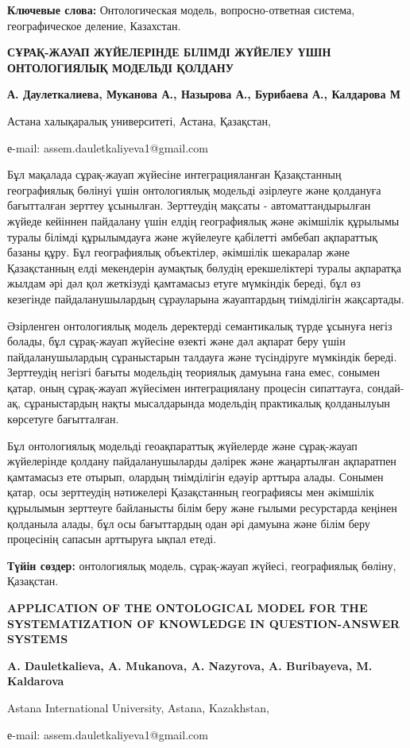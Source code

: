 {\bfseries Ключевые слова:} Онтологическая модель, вопросно-ответная
система, географическое деление, Казахстан.

\begin{center}
{\large\bfseries СҰРАҚ-ЖАУАП ЖҮЙЕЛЕРІНДЕ БІЛІМДІ ЖҮЙЕЛЕУ ҮШІН ОНТОЛОГИЯЛЫҚ МОДЕЛЬДІ ҚОЛДАНУ}

{\bfseries А. Даулеткалиева\envelope, Муканова А., Назырова А., Бурибаева А.,
Калдарова М}

Астана халықаралық университеті, Астана, Қазақстан,

е-mail: assem.dauletkaliyeva1@gmail.com
\end{center}

Бұл мақалада сұрақ-жауап жүйесіне интеграцияланған Қазақстанның
географиялық бөлінуі үшін онтологиялық модельді әзірлеуге және қолдануға
бағытталған зерттеу ұсынылған. Зерттеудің мақсаты - автоматтандырылған
жүйеде кейіннен пайдалану үшін елдің географиялық және әкімшілік
құрылымы туралы білімді құрылымдауға және жүйелеуге қабілетті әмбебап
ақпараттық базаны құру. Бұл географиялық объектілер, әкімшілік шекаралар
және Қазақстанның елді мекендерін аумақтық бөлудің ерекшеліктері туралы
ақпаратқа жылдам әрі дәл қол жеткізуді қамтамасыз етуге мүмкіндік
береді, бұл өз кезегінде пайдаланушылардың сұрауларына жауаптардың
тиімділігін жақсартады.

Әзірленген онтологиялық модель деректерді семантикалық түрде ұсынуға
негіз болады, бұл сұрақ-жауап жүйесіне өзекті және дәл ақпарат беру үшін
пайдаланушылардың сұраныстарын талдауға және түсіндіруге мүмкіндік
береді. Зерттеудің негізгі бағыты модельдің теориялық дамуына ғана емес,
сонымен қатар, оның сұрақ-жауап жүйесімен интеграциялану процесін
сипаттауға, сондай-ақ, сұраныстардың нақты мысалдарында модельдің
практикалық қолданылуын көрсетуге бағытталған.

Бұл онтологиялық модельді геоақпараттық жүйелерде және сұрақ-жауап
жүйелерінде қолдану пайдаланушыларды дәлірек және жаңартылған ақпаратпен
қамтамасыз ете отырып, олардың тиімділігін едәуір арттыра алады. Сонымен
қатар, осы зерттеудің нәтижелері Қазақстанның географиясы мен әкімшілік
құрылымын зерттеуге байланысты білім беру және ғылыми ресурстарда
кеңінен қолданыла алады, бұл осы бағыттардың одан әрі дамуына және білім
беру процесінің сапасын арттыруға ықпал етеді.

{\bfseries Түйін сөздер:} онтологиялық модель, сұрақ-жауап жүйесі,
географиялық бөліну, Қазақстан.

\begin{center}
{\large\bfseries APPLICATION OF THE ONTOLOGICAL MODEL FOR THE SYSTEMATIZATION OF
KNOWLEDGE IN QUESTION-ANSWER SYSTEMS}

{\bfseries A. Dauletkalieva\envelope, A. Mukanova, A. Nazyrova, A. Buribayeva, M.
Kaldarova}

Astana International University, Astana, Kazakhstan,

е-mail: assem.dauletkaliyeva1@gmail.com
\end{center}

